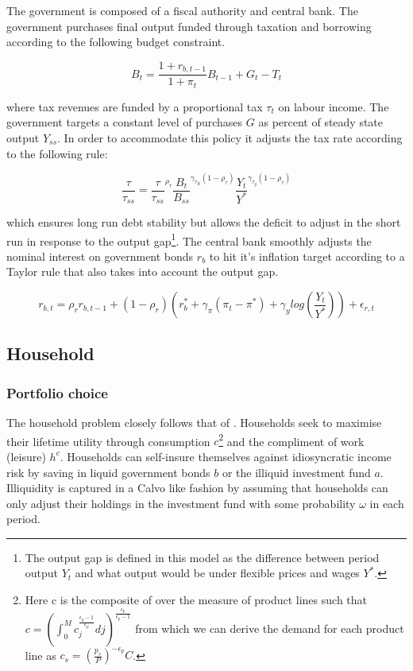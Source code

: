 \documentclass[12pt]{article}
\begin{document}
The government is composed of a fiscal authority and central bank. The government purchases final output funded through taxation and borrowing according to the following budget constraint. 

\begin{equation}
    B_{t}=\frac{1+r_{b,t-1}}{1+\pi_{t}}B_{t-1}+G_{t}-T_{t}
    \label{eq:gov1}
\end{equation}

where tax revenues are funded by a proportional tax $\tau_{t}$ on labour income. The government targets a constant level of purchases $G$ as percent of steady state output $Y_{ss}$. In order to accommodate this policy it adjusts the tax rate according to the following rule:

\begin{equation}
    \frac{\tau}{\tau_{ss}}=\frac{\tau}{\tau_{ss}}^{\rho_{\tau}}\frac{B_{t}}{B_{ss}}^{\gamma_{\tau_{B}}(1-\rho_\tau)}\frac{Y_{t}}{Y^{*}}^{\gamma_{\tau_{y}}(1-\rho_\tau)}
    \label{eq:gov2}
\end{equation}

which ensures long run debt stability but allows the deficit to adjust in the short run in response to the output gap\footnote{The output gap is defined in this model as the difference between period output $Y_{t}$ and what output would be under flexible prices and wages $Y^{*}$.}. The central bank smoothly adjusts the nominal interest on government bonds $r_{b}$ to hit it's inflation target according to a Taylor rule that also takes into account the output gap. 

\begin{equation}
    r_{b,t}=\rho_{r}r_{b,t-1}+(1-\rho_{r})(r_{b}^{*}+\gamma_{\pi}(\pi_{t}-\pi^*)+\gamma_{y}log(\frac{Y_{t}}{Y^{*}}))+\epsilon_{r,t}
\label{eq:gov3}
\end{equation}

\subsection{Household}

\subsubsection{Portfolio choice}

The household problem closely follows that of \cite{bayer2019precautionary}. Households seek to maximise their lifetime utility through consumption $c$\footnote{Here c is the composite of over the measure of product lines such that $c=\left(\int_{0}^M c_{j}^{\frac{\epsilon_{p}-1}{\epsilon_{p}}}dj\right)^{\frac{\epsilon_{p}}{\epsilon_{p}-1}}$ from which we can derive the demand for each product line as $c_{s}=\left( \frac{p_{s}}{P} \right) ^{-\epsilon_{p}}C $.} and the compliment of work (leisure) $h^c$. Households can self-insure themselves against idiosyncratic income risk by saving in liquid government bonds $b$ or the illiquid investment fund $a$. Illiquidity is captured in a Calvo like fashion by assuming that households can only adjust their holdings in the investment fund with some probability $\omega$ in each period.  
\end{document}
